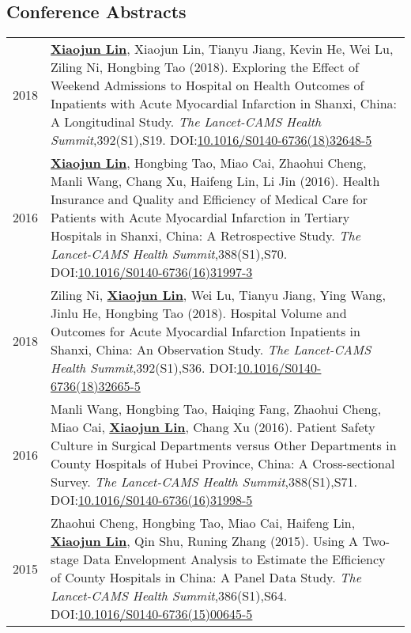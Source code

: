 \documentclass[a4paper,10pt]{article}
\begin{document}
\subsection*{Conference Abstracts}
\begin{longtable}{r p{13cm}}
2018 & \underline{\textbf{Xiaojun Lin}}, Xiaojun Lin, Tianyu Jiang, Kevin He, Wei Lu, Ziling Ni, Hongbing Tao (2018). Exploring the Effect of Weekend Admissions to Hospital on Health Outcomes of Inpatients with Acute Myocardial Infarction in Shanxi, China: A Longitudinal Study. \emph{The Lancet-CAMS Health Summit},392(S1),S19. DOI:\href{https://doi.org/10.1016/S0140-6736(18)32648-5}{10.1016/S0140-6736(18)32648-5}\\[5pt]


2016 & \underline{\textbf{Xiaojun Lin}}, Hongbing Tao, Miao Cai, Zhaohui Cheng, Manli Wang, Chang Xu, Haifeng Lin, Li Jin (2016). Health Insurance and Quality and Efficiency of Medical Care for Patients with Acute Myocardial Infarction in Tertiary Hospitals in Shanxi, China: A Retrospective Study. \emph{The Lancet-CAMS Health Summit},388(S1),S70. DOI:\href{https://doi.org/10.1016/S0140-6736(16)31997-3}{10.1016/S0140-6736(16)31997-3}\\[5pt]

2018 & Ziling Ni, \underline{\textbf{Xiaojun Lin}}, Wei Lu, Tianyu Jiang, Ying Wang, Jinlu He, Hongbing Tao (2018). Hospital Volume and Outcomes for Acute Myocardial Infarction Inpatients in Shanxi, China: An Observation Study.  \emph{The Lancet-CAMS Health Summit},392(S1),S36. DOI:\href{https://doi.org/10.1016/S0140-6736(18)32665-5}{10.1016/S0140-6736(18)32665-5}\\[5pt]

2016 & Manli Wang, Hongbing Tao, Haiqing Fang, Zhaohui Cheng, Miao Cai, \underline{\textbf{Xiaojun Lin}}, Chang Xu (2016). Patient Safety Culture in Surgical Departments versus Other Departments in County Hospitals of Hubei Province, China: A Cross-sectional Survey.  \emph{The Lancet-CAMS Health Summit},388(S1),S71. DOI:\href{https://doi.org/10.1016/S0140-6736(16)31998-5}{10.1016/S0140-6736(16)31998-5}\\[5pt]

2015 & Zhaohui Cheng, Hongbing Tao, Miao Cai, Haifeng Lin, \underline{\textbf{Xiaojun Lin}}, Qin Shu, Runing Zhang (2015). Using A Two-stage Data Envelopment Analysis to Estimate the Efficiency of County Hospitals in China: A Panel Data Study.  \emph{The Lancet-CAMS Health Summit},386(S1),S64. DOI:\href{https://doi.org/10.1016/S0140-6736(15)00645-5}{10.1016/S0140-6736(15)00645-5}\\[5pt]

\end{longtable}
\end{document}
